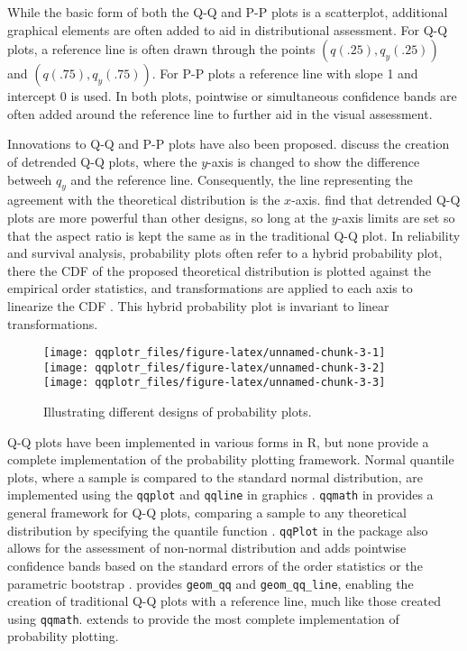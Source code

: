 While the basic form of both the Q-Q and P-P plots is a scatterplot,
additional graphical elements are often added to aid in distributional
assessment. For Q-Q plots, a reference line is often drawn through the
points \((q(.25), q_y(.25))\) and \((q(.75), q_y(.75))\). For P-P plots
a reference line with slope 1 and intercept 0 is used. In both plots,
pointwise or simultaneous confidence bands are often added around the
reference line to further aid in the visual assessment.

Innovations to Q-Q and P-P plots have also been proposed.
\citet{Loy2016-fg} discuss the creation of detrended Q-Q plots, where
the \(y\)-axis is changed to show the difference betweeh \(q_y\) and the
reference line. Consequently, the line representing the agreement with
the theoretical distribution is the \(x\)-axis. \citet{Loy2016-fg} find
that detrended Q-Q plots are more powerful than other designs, so long
at the \(y\)-axis limits are set so that the aspect ratio is kept the
same as in the traditional Q-Q plot. In reliability and survival
analysis, probability plots often refer to a hybrid probability plot,
there the CDF of the proposed theoretical distribution is plotted
against the empirical order statistics, and transformations are applied
to each axis to linearize the CDF \citep[cf.][chapter 6]{Meeker1998}.
This hybrid probability plot is invariant to linear transformations.

\begin{Schunk}
\begin{figure}

{\centering \texttt{[image: qqplotr\_files/figure-latex/unnamed-chunk-3-1]} \texttt{[image: qqplotr\_files/figure-latex/unnamed-chunk-3-2]} \texttt{[image: qqplotr\_files/figure-latex/unnamed-chunk-3-3]} 

}

\caption{\label{fig:pp}Illustrating different designs of probability plots.}\label{fig:unnamed-chunk-3}
\end{figure}
\end{Schunk}

Q-Q plots have been implemented in various forms in R, but none provide
a complete implementation of the probability plotting framework. Normal
quantile plots, where a sample is compared to the standard normal
distribution, are implemented using the \texttt{qqplot} and
\texttt{qqline} in  graphics \citep{R}. \texttt{qqmath} in
 provides a general framework for Q-Q plots, comparing a
sample to any theoretical distribution by specifying the quantile
function \citep{lattice}. \texttt{qqPlot} in the  package also
allows for the assessment of non-normal distribution and adds pointwise
confidence bands based on the standard errors of the order statistics or
the parametric bootstrap \citep{car}.  provides
\texttt{geom\_qq} and \texttt{geom\_qq\_line}, enabling the creation of
traditional Q-Q plots with a reference line, much like those created
using \texttt{qqmath}.  extends  to provide
the most complete implementation of probability plotting.

